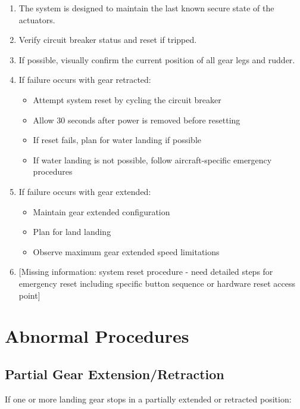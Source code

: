 \documentclass[12pt,a4paper,twoside,openright]{book}
\begin{document}
\begin{enumerate}
    \item The system is designed to maintain the last known secure state of the actuators.
    \item Verify circuit breaker status and reset if tripped.
    \item If possible, visually confirm the current position of all gear legs and rudder.
    \item If failure occurs with gear retracted:
    \begin{itemize}
        \item Attempt system reset by cycling the circuit breaker
        \item Allow 30 seconds after power is removed before resetting
        \item If reset fails, plan for water landing if possible
        \item If water landing is not possible, follow aircraft-specific emergency procedures
    \end{itemize}
    \item If failure occurs with gear extended:
\begin{itemize}
        \item Maintain gear extended configuration
        \item Plan for land landing
        \item Observe maximum gear extended speed limitations
\end{itemize}
    \item {\color{red}[Missing information: system reset procedure - need detailed steps for emergency reset including specific button sequence or hardware reset access point]}
\end{enumerate}

\section{Abnormal Procedures}

\subsection{Partial Gear Extension/Retraction}

If one or more landing gear stops in a partially extended or retracted position:
\end{document}
